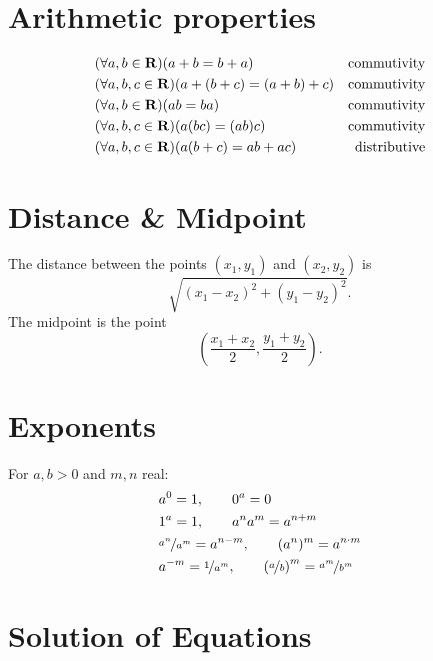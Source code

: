 \documentclass[letterpaper,landscape,9pt,fleqn]{extarticle}
\newcommand{\reals}{\mathbf{R}}
\DeclarePairedDelimiter{\parens}{\lparen}{\rparen}
\begin{document}
\begin{multicols*}{3}
\section*{Arithmetic properties}
\begin{alignat*}{2}
    &\parens*{\forall a,b\in \reals} \parens*{a + b = b + a} & \mbox{commutivity}\\
    &\parens*{\forall a,b,c\in \reals} \parens*{a + (b + c)  = (a+b)+c} & \mbox{commutivity}\\
    &\parens*{\forall a,b \in \reals} \parens*{a  b = b a} & \mbox{commutivity}\\
    &\parens*{\forall a,b,c \in \reals} \parens*{a  (b c) = (a b) c} & \mbox{commutivity}\\
    &\parens*{\forall a,b,c \in \reals} \parens*{a (b+c) =a b + a c} & \mbox{distributive}\\
\end{alignat*}


\section*{Distance \& Midpoint}
The distance between the points \((x_1,y_1)\) and  \((x_2,y_2)\) is
\[
  \sqrt{(x_1-x_2)^2 + (y_1-y_2)^2}.
\]
The midpoint is the point
\[
\left(\frac{x_1+x_2}{2}, \frac{y_1+y_2}{2} \right).
\]

\section*{Exponents}
\vspace{-0.15in}
\begin{minipage}[c]{2.0in}
For \(a,b > 0\) and \(m,n\) real:
\begin{alignat*}{1}
&a^0 = 1,  \quad \quad 0^a = 0\\
&1^a = 1, \quad \quad  a^n a^m = a^{n+m}  \\
&\nicefrac{a^n}{a^m} = a^{n-m}, \quad \quad (a^n)^m = a^{n \cdot m} \\
&a^{-m} = \nicefrac{1}{a^m}, \quad \quad \left(\nicefrac{a}{b}\right)^m = \nicefrac{a^m}{b^m} 
\end{alignat*}
\end{minipage}

\section*{Solution of Equations}
\vspace{-0.2in}

\end{multicols*}
\end{document}
